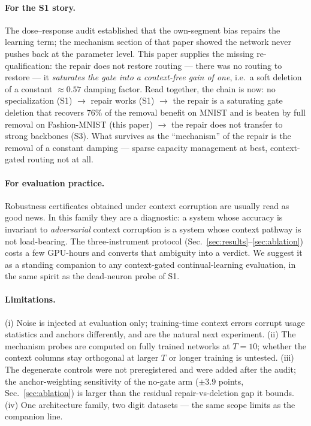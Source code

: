 \documentclass[review,12pt,number]{elsarticle}
\begin{document}
\paragraph{For the S1 story.} The dose--response audit established that
the own-segment bias repairs the learning term; the mechanism section of
that paper showed the network never pushes back at the parameter level.
This paper supplies the missing re-qualification: the repair does not
restore routing --- there was no routing to restore --- it \emph{saturates
the gate into a context-free gain of one}, i.e.\ a soft deletion of a
constant ${\approx}0.57$ damping factor. Read together, the chain is
now: no specialization (S1) $\to$ repair works (S1) $\to$ the repair is
a saturating gate deletion that recovers $76\%$ of the removal benefit
on MNIST and is beaten by full removal on Fashion-MNIST (this paper)
$\to$ the repair does not transfer to strong backbones (S3). What
survives as the ``mechanism'' of the repair is the removal of a constant
damping --- sparse capacity management at best, context-gated routing
not at all.

\paragraph{For evaluation practice.} Robustness certificates obtained
under context corruption are usually read as good news. In this family
they are a diagnostic: a system whose accuracy is invariant to
\emph{adversarial} context corruption is a system whose context pathway
is not load-bearing. The three-instrument protocol
(Sec.~\ref{sec:results}--\ref{sec:ablation}) costs a few GPU-hours and
converts that ambiguity into a verdict. We suggest it as a standing
companion to any context-gated continual-learning evaluation, in the
same spirit as the dead-neuron probe of S1.

\paragraph{Limitations.} (i) Noise is injected at evaluation only;
training-time context errors corrupt usage statistics and anchors
differently, and are the natural next experiment. (ii) The mechanism
probes are computed on fully trained networks at $T{=}10$; whether the
context columns stay orthogonal at larger $T$ or longer training is
untested. (iii) The degenerate controls were not preregistered and were
added after the audit; the anchor-weighting sensitivity of the no-gate
arm ($\pm 3.9$ points, Sec.~\ref{sec:ablation}) is larger than the
residual repair-vs-deletion gap it bounds. (iv) One architecture
family, two digit datasets --- the same scope limits as the companion
line.
\end{document}
